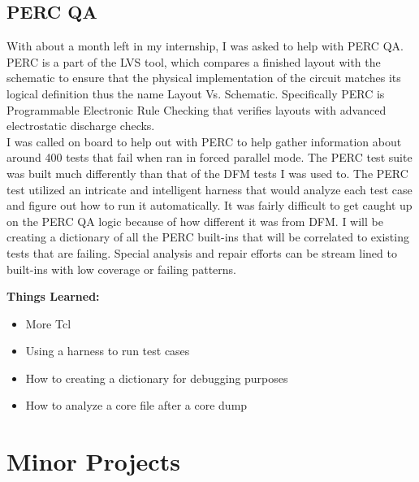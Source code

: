 \documentclass[letterpaper,10pt,notitlepage,fleqn]{article}
\begin{document}
\subsection{PERC QA}
\indent With about a month left in my internship, I was asked to help with 
PERC QA. PERC is a part of the LVS tool, which compares a finished layout with the schematic 
to ensure that the physical implementation of the circuit matches its logical definition 
thus the name Layout Vs. Schematic. Specifically PERC is Programmable Electronic Rule 
Checking that verifies layouts with advanced electrostatic discharge checks.
\\
\indent I was called on board to help out with PERC to help gather information about around 
400 tests that fail when ran in forced parallel mode. The PERC test suite was built 
much differently than that of the DFM tests I was used to. The PERC test utilized an intricate 
and intelligent harness that would analyze each test case and figure out how to run 
it automatically. It was fairly difficult to get caught up on the PERC QA logic 
because of how different it was from DFM. I will be creating a dictionary of all 
the PERC built-ins that will be correlated to existing tests that are failing. 
Special analysis and repair efforts can be stream lined to built-ins with low 
coverage or failing patterns.

\textbf{Things Learned:}
\begin{itemize} 
        \item More Tcl
        \item Using a harness to run test cases
        \item How to creating a dictionary for debugging purposes
        \item How to analyze a core file after a core dump
    \end{itemize}

\section{Minor Projects}
\end{document}
